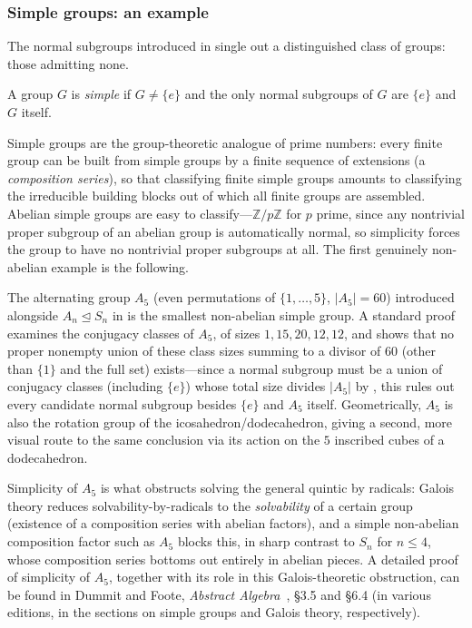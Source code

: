 \documentclass[mathematics,review,submit,moreauthors]{Definitions/mdpi}
\begin{document}

\subsubsection{Simple groups: an example}
\label{subsubsec:simple-groups}

The normal subgroups introduced in  single out a
distinguished class of groups: those admitting none.

\begin{Definition}
\label{def:simple-group}
A group $G$ is \emph{simple} if $G \neq \{e\}$ and the only normal subgroups
of $G$ are $\{e\}$ and $G$ itself.
\end{Definition}

Simple groups are the group-theoretic analogue of prime numbers: every
finite group can be built from simple groups by a finite sequence of
extensions (a \emph{composition series}), so that classifying finite simple
groups amounts to classifying the irreducible building blocks out of which
all finite groups are assembled. Abelian simple groups are easy to
classify---$\mathbb{Z}/p\mathbb{Z}$ for $p$ prime, since any nontrivial
proper subgroup of an abelian group is automatically normal, so simplicity
forces the group to have no nontrivial proper subgroups at all. The first
genuinely non-abelian example is the following.

\begin{Example}[$A_5$ is simple]
\label{ex:A5-simple}
The alternating group $A_5$ (even permutations of $\{1,\dots,5\}$,
$|A_5| = 60$) introduced alongside $A_n \trianglelefteq S_n$ in
 is the smallest non-abelian simple group. A
standard proof examines the conjugacy classes of $A_5$, of sizes
$1, 15, 20, 12, 12$, and shows that no proper nonempty union of these class
sizes summing to a divisor of $60$ (other than $\{1\}$ and the full set)
exists---since a normal subgroup must be a union of conjugacy classes
(including $\{e\}$) whose total size divides $|A_5|$ by
, this rules out every candidate normal
subgroup besides $\{e\}$ and $A_5$ itself. Geometrically, $A_5$ is also the
rotation group of the icosahedron/dodecahedron, giving a second,
more visual route to the same conclusion via its action on the $5$
inscribed cubes of a dodecahedron.

Simplicity of $A_5$ is what obstructs solving the general quintic by
radicals: Galois theory reduces solvability-by-radicals to the
\emph{solvability} of a certain group (existence of a composition series
with abelian factors), and a simple non-abelian composition factor such as
$A_5$ blocks this, in sharp contrast to $S_n$ for $n \leq 4$, whose
composition series bottoms out entirely in abelian pieces. A detailed proof
of simplicity of $A_5$, together with its role in this Galois-theoretic
obstruction, can be found in Dummit and Foote,
\emph{Abstract Algebra}~\citep{dummit2003}, \S 3.5 and \S 6.4 (in various
editions, in the sections on simple groups and Galois theory,
respectively).
\end{Example}
\end{document}
